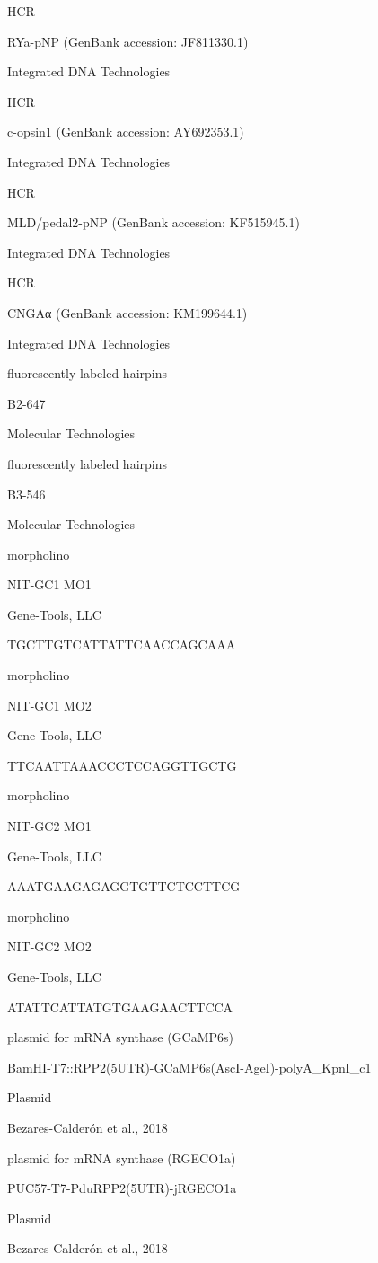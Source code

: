\documentclass[
  10pt,
  onecolumn]{article}
\begin{document}
HCR

RYa-pNP (GenBank accession: JF811330.1)

Integrated DNA Technologies

HCR

c-opsin1 (GenBank accession: AY692353.1)

Integrated DNA Technologies

HCR

MLD/pedal2-pNP (GenBank accession: KF515945.1)

Integrated DNA Technologies

HCR

CNGAα (GenBank accession: KM199644.1)

Integrated DNA Technologies

fluorescently labeled hairpins

B2-647

Molecular Technologies

fluorescently labeled hairpins

B3-546

Molecular Technologies

morpholino

NIT-GC1 MO1

Gene-Tools, LLC

TGCTTGTCATTATTCAACCAGCAAA

morpholino

NIT-GC1 MO2

Gene-Tools, LLC

TTCAATTAAACCCTCCAGGTTGCTG

morpholino

NIT-GC2 MO1

Gene-Tools, LLC

AAATGAAGAGAGGTGTTCTCCTTCG

morpholino

NIT-GC2 MO2

Gene-Tools, LLC

ATATTCATTATGTGAAGAACTTCCA

plasmid for mRNA synthase (GCaMP6s)

BamHI-T7::RPP2(5UTR)-GCaMP6s(AscI-AgeI)-polyA\_KpnI\_c1

Plasmid

Bezares-Calderón et al., 2018

plasmid for mRNA synthase (RGECO1a)

PUC57-T7-PduRPP2(5UTR)-jRGECO1a

Plasmid

Bezares-Calderón et al., 2018
\end{document}
